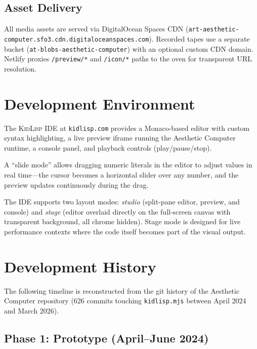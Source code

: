 \documentclass[10pt,letterpaper,twocolumn]{article}
\newcommand{\kidlisp}{\textsc{KidLisp}}
\begin{document}
\subsection{Asset Delivery}

All media assets are served via DigitalOcean Spaces CDN (\texttt{art-aesthetic-computer.sfo3.cdn.\allowbreak digitaloceanspaces.com}). Recorded tapes use a separate bucket (\texttt{at-blobs-aesthetic-computer}) with an optional custom CDN domain. Netlify proxies \texttt{/preview/*} and \texttt{/icon/*} paths to the oven for transparent URL resolution.


\section{Development Environment}

The \kidlisp{} IDE at \texttt{kidlisp.com} provides a Monaco-based editor with custom syntax highlighting, a live preview iframe running the Aesthetic Computer runtime, a console panel, and playback controls (play/pause/stop).

A ``slide mode'' allows dragging numeric literals in the editor to adjust values in real time---the cursor becomes a horizontal slider over any number, and the preview updates continuously during the drag.

The IDE supports two layout modes: \emph{studio} (split-pane editor, preview, and console) and \emph{stage} (editor overlaid directly on the full-screen canvas with transparent background, all chrome hidden). Stage mode is designed for live performance contexts where the code itself becomes part of the visual output.


\section{Development History}
\label{sec:history}

The following timeline is reconstructed from the git history of the Aesthetic Computer repository (626 commits touching \texttt{kidlisp.mjs} between April 2024 and March 2026).

\subsection{Phase 1: Prototype (April--June 2024)}
\end{document}
